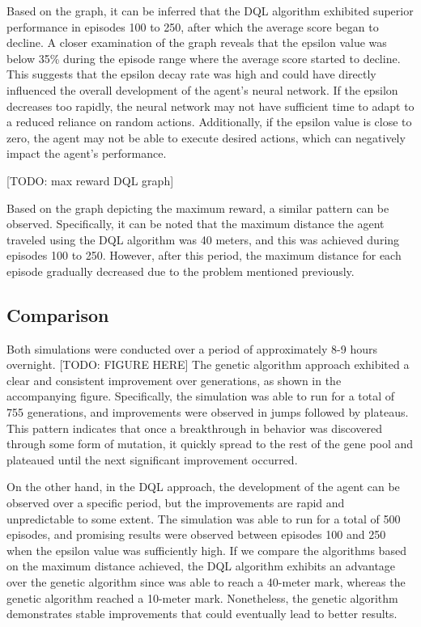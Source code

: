 \documentclass[letterpaper]{article} %
\begin{document}
\par Based on the graph, it can be inferred that the DQL algorithm exhibited superior performance in episodes 100 to 250, after which the average score began to decline. A closer examination of the graph reveals that the epsilon value was below 35\% during the episode range where the average score started to decline. This suggests that the epsilon decay rate was high and could have directly influenced the overall development of the agent's neural network. If the epsilon decreases too rapidly, the neural network may not have sufficient time to adapt to a reduced reliance on random actions. Additionally, if the epsilon value is close to zero, the agent may not be able to execute desired actions, which can negatively impact the agent's performance.

[TODO: max reward DQL graph]

\par Based on the graph depicting the maximum reward, a similar pattern can be observed. Specifically, it can be noted that the maximum distance the agent traveled using the DQL algorithm was 40 meters, and this was achieved during episodes 100 to 250. However, after this period, the maximum distance for each episode gradually decreased due to the problem mentioned previously.

\subsection{Comparison}
\par Both simulations were conducted over a period of approximately 8-9 hours overnight. [TODO: FIGURE HERE] The genetic algorithm approach exhibited a clear and consistent improvement over generations, as shown in the accompanying figure. Specifically, the simulation was able to run for a total of 755 generations, and improvements were observed in jumps followed by plateaus. This pattern indicates that once a breakthrough in behavior was discovered through some form of mutation, it quickly spread to the rest of the gene pool and plateaued until the next significant improvement occurred.
\par On the other hand, in the DQL approach, the development of the agent can be observed over a specific period, but the improvements are rapid and unpredictable to some extent. The simulation was able to run for a total of 500 episodes, and promising results were observed between episodes 100 and 250 when the epsilon value was sufficiently high. If we compare the algorithms based on the maximum distance achieved, the DQL algorithm exhibits an advantage over the genetic algorithm since was able to reach a 40-meter mark, whereas the genetic algorithm reached a 10-meter mark. Nonetheless, the genetic algorithm demonstrates stable improvements that could eventually lead to better results.

\end{document}
